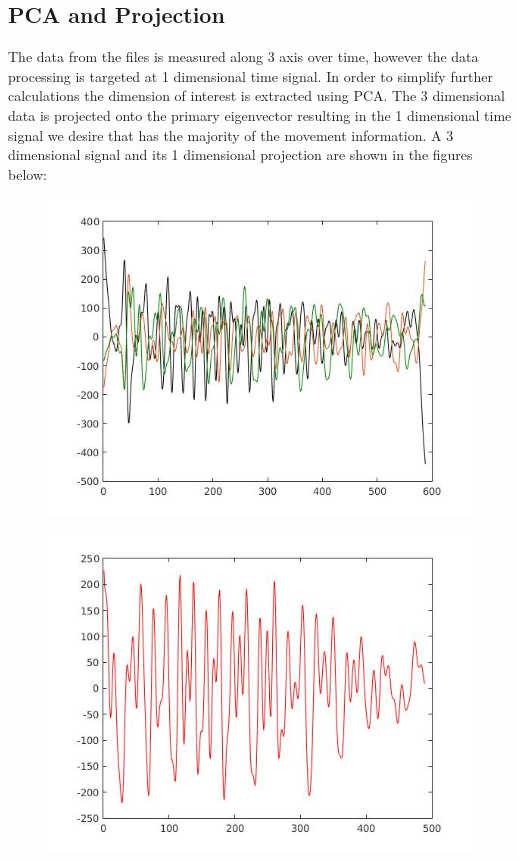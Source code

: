 \documentclass[10pt,twocolumn,letterpaper]{article}
\begin{document}
\subsection{PCA and Projection}

The data from the files is measured along 3 axis over time, however the data processing is targeted at 1 dimensional time signal.  In order to simplify further calculations the dimension of interest is extracted using PCA.  The 3 dimensional data is projected onto the primary eigenvector resulting in the 1 dimensional time signal we desire that has the majority of the movement information.  A 3 dimensional signal and its 1 dimensional projection are shown in the figures below:

\begin{figure}[t]
\begin{center}
   \includegraphics[width=0.8\linewidth]{../img/fig6.jpg}
   \caption{}
\end{center}
\end{figure}

\begin{figure}[t]
\begin{center}
   \includegraphics[width=0.8\linewidth]{../img/fig7.jpg}
   \caption{}
\end{center}
\end{figure}
\end{document}
